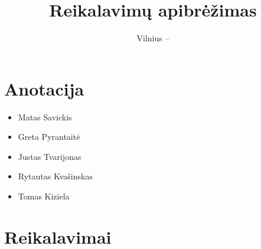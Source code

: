 \documentclass[oneside]{VUMIFPSkursinis}
\title{Reikalavimų apibrėžimas}
\date{Vilnius – \the\year}
\begin{document}
\maketitle
\tableofcontents

\section{Anotacija}
	\begin{itemize}
		\item Matas Savickis
		\item Greta Pyrantaitė
		\item Justas Tvarijonas
		\item Rytautas Kvašinskas
		\item Tomas Kiziela
	\end{itemize}

\section {Reikalavimai}
\end{document}
